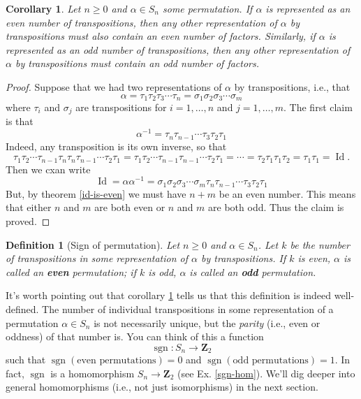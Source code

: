 \documentclass[12pt]{article}
\numberwithin{equation}{subsection}
\newtheorem{defn}[subsection]{Definition}
\newtheorem{corollary}[subsection]{Corollary}
\theoremstyle{note}
\newcommand{\Id}{\operatorname{Id}}
\begin{document}
\begin{corollary} \label{sign-is-well-def}
	Let $n\geq 0$ and $\alpha\in S_n$ some permutation. If $\alpha$ is represented as an even number of transpositions, then any other representation of $\alpha$ by transpositions must also contain an even number of factors. Similarly, if $\alpha$ is represented as an odd number of transpositions, then any other representation of $\alpha$ by transpositions must contain an odd number of factors. 
\end{corollary}

\begin{proof}
	 Suppose that we had two representations of $\alpha$ by transpositions, i.e., that\[\alpha=\tau_1\tau_2\tau_3\cdots\tau_n=\sigma_1\sigma_2\sigma_3\cdots\sigma_m\] where $\tau_i$ and $\sigma_j$ are transpositions for $i=1,\dots,n$ and $j=1,\dots,m$. The first claim is that \[ \alpha^{-1}=\tau_n \tau_{n-1}\cdots \tau_3\tau_2\tau_1\] Indeed, any transposition is its own inverse, so that \[\tau_1\tau_2\cdots\tau_{n-1}\tau_n\tau_n\tau_{n-1}\cdots\tau_2\tau_1=\tau_1\tau_2\cdots\tau_{n-1}\tau_{n-1}\cdots \tau_2\tau_1=\cdots=\tau_2\tau_1\tau_1\tau_2=\tau_1\tau_1=\Id.\] Then we cxan write \[ \Id=\alpha \alpha^{-1}=\sigma_1\sigma_2\sigma_3\cdots\sigma_m\tau_n \tau_{n-1}\cdots \tau_3\tau_2\tau_1\] But, by theorem \ref{id-is-even} we must have $n+m$ be an even number. This means that either $n$ and $m$ are both even or $n$ and $m$ are both odd. Thus the claim is proved. 
\end{proof}

\begin{defn}[Sign of permutation]
Let $n\geq 0$ and $\alpha\in S_n$. Let $k$ be the number of transpositions in some representation of $\alpha$ by transpositions. If $k$ is even, $\alpha$ is called an \textbf{even} permutation; if $k$ is odd, $\alpha$ is called an \textbf{odd} permutation.
\end{defn}

It's worth pointing out that corollary \ref{sign-is-well-def} tells us that this definition is indeed well-defined. The number of individual transpositions in some representation of a permutation $\alpha\in S_n$ is not necessarily unique, but the \textit{parity} (i.e., even or oddness) of that number is. You can think of this a function \begin{equation} \operatorname{sgn}\colon S_n \to \mathbf{Z}_2\end{equation} such that $\operatorname{sgn}( \text{even permutations})=0$ and $\operatorname{sgn}(\text{odd permutations})=1$. In fact, $\operatorname{sgn}$ is a homomorphism $S_n\to \mathbf{Z}_2$ (see Ex. \ref{sgn-hom}). We'll dig deeper into general homomorphisms (i.e., not just isomorphisms) in the next section. 
\end{document}
